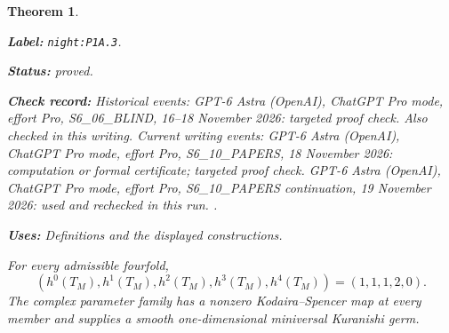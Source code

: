 \documentclass[11pt,a4paper]{article}
\newtheorem{theorem}{Theorem}[section]
\theoremstyle{definition}
\newcommand{\StatementRecord}[4]{\par\smallskip\begingroup\upshape\raggedright\noindent\textbf{Label:} \nolinkurl{#1}.\par\noindent\textbf{Status:} #2.\par\noindent\textbf{Check record:} #3.\par\noindent\textbf{Uses:} #4.\par\endgroup\smallskip}
\begin{document}
\begin{theorem}\label{night:P1A.3}
\StatementRecord{night:P1A.3}{proved}{Historical events: GPT-6 Astra (OpenAI), ChatGPT Pro mode, effort Pro, S6\_06\_BLIND, 16--18 November 2026: targeted proof check. Also checked in this writing. Current writing events: GPT-6 Astra (OpenAI), ChatGPT Pro mode, effort Pro, S6\_10\_PAPERS, 18 November 2026: computation or formal certificate; targeted proof check. GPT-6 Astra (OpenAI), ChatGPT Pro mode, effort Pro, S6\_10\_PAPERS continuation, 19 November 2026: used and rechecked in this run. }{Definitions and the displayed constructions}
For every admissible fourfold,
\[
 (h^0(T_M),h^1(T_M),h^2(T_M),h^3(T_M),h^4(T_M))
 =(1,1,1,2,0).
\]
The complex parameter family has a nonzero Kodaira--Spencer map
at every member and supplies a smooth one-dimensional miniversal
Kuranishi germ.
\end{theorem}
\end{document}
